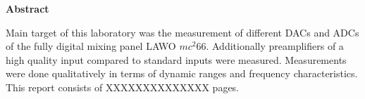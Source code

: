 \documentclass[11pt]{report}
\begin{document}



\newpage
{}
\vspace*{2.2 cm}
{\Large
\noindent
{\bf Abstract}} \\
\vspace*{0.3 cm}

\noindent
Main target of this laboratory was the measurement of different DACs and ADCs of the fully digital mixing panel LAWO $mc^2 66$. Additionally preamplifiers of a high quality input compared to standard inputs were measured. Measurements were done qualitatively in terms of dynamic ranges and frequency characteristics.\\
This report consists of XXXXXXXXXXXXXX pages. 









\renewcommand{\nomname}{List of abbreviations}
\setlength{\nomlabelwidth}{.50\hsize}
\renewcommand{\nomlabel}[1]{#1 \dotfill}
\setlength{\nomitemsep}{-\parsep}
\makenomenclature

\newpage
{}

\end{document}
